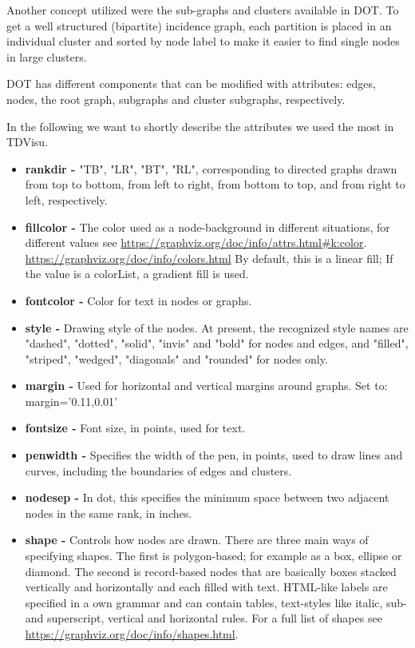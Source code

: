 \documentclass[a4paper, 12pt, bibliography=totoc]{scrartcl}
\begin{document}
Another concept utilized were the sub-graphs and clusters available in DOT.
To get a well structured (bipartite) incidence graph, each partition is placed in an individual cluster and sorted by node label to make it easier to find single nodes in large clusters.

DOT has different components that can be modified with attributes: edges, nodes, the root graph, subgraphs and cluster subgraphs, respectively.

In the following we want to shortly describe the attributes we used the most in TDVisu.

\begin{itemize}
	\item \textbf{rankdir -} "TB", "LR", "BT", "RL", corresponding to directed graphs drawn from top to bottom, from left to right, from bottom to top, and from right to left, respectively.
	
	\item \textbf{fillcolor -} The color used as a node-background in different situations, for different values see \url{https://graphviz.org/doc/info/attrs.html#k:color}. \url{https://graphviz.org/doc/info/colors.html} 
	By default, this is a linear fill; If the value is a colorList, a gradient fill is used. 
	
	\item \textbf{fontcolor -} Color for text in nodes or graphs. 
	
	\item \textbf{style -} Drawing style of the nodes.
	At present, the recognized style names are "dashed", "dotted", "solid", "invis" and "bold" for nodes and edges,  and "filled", "striped", "wedged", "diagonals" and "rounded" for nodes only.
	
	\item 
	\textbf{margin -} Used for horizontal and vertical margins around graphs. Set to: margin='0.11,0.01'
	
	\item \textbf{fontsize -} Font size, in points, used for text. 
	
	\item \textbf{penwidth -} Specifies the width of the pen, in points, used to draw lines and curves, including the boundaries of edges and clusters. 
	
	\item \textbf{nodesep -} In dot, this specifies the minimum space between two adjacent nodes in the same rank, in inches. 
	
	\item \textbf{shape -} Controls how nodes are drawn. There are three main ways of specifying shapes. The first is polygon-based; for example as a box, ellipse or diamond. The second is record-based nodes that are basically boxes stacked vertically and horizontally and each filled with text. HTML-like labels are specified in a own grammar and can contain tables, text-styles like italic, sub- and superscript, vertical and horizontal rules. For a full list of shapes see \url{https://graphviz.org/doc/info/shapes.html}.
\end{itemize}
\end{document}
